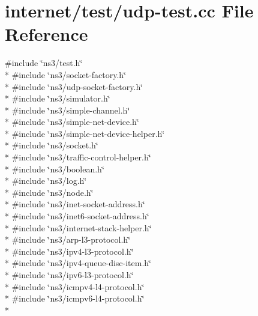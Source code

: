 \hypertarget{udp-test_8cc}{}\section{internet/test/udp-\/test.cc File Reference}
\label{udp-test_8cc}
{\ttfamily \#include \char`\"{}ns3/test.\+h\char`\"{}}\\*
{\ttfamily \#include \char`\"{}ns3/socket-\/factory.\+h\char`\"{}}\\*
{\ttfamily \#include \char`\"{}ns3/udp-\/socket-\/factory.\+h\char`\"{}}\\*
{\ttfamily \#include \char`\"{}ns3/simulator.\+h\char`\"{}}\\*
{\ttfamily \#include \char`\"{}ns3/simple-\/channel.\+h\char`\"{}}\\*
{\ttfamily \#include \char`\"{}ns3/simple-\/net-\/device.\+h\char`\"{}}\\*
{\ttfamily \#include \char`\"{}ns3/simple-\/net-\/device-\/helper.\+h\char`\"{}}\\*
{\ttfamily \#include \char`\"{}ns3/socket.\+h\char`\"{}}\\*
{\ttfamily \#include \char`\"{}ns3/traffic-\/control-\/helper.\+h\char`\"{}}\\*
{\ttfamily \#include \char`\"{}ns3/boolean.\+h\char`\"{}}\\*
{\ttfamily \#include \char`\"{}ns3/log.\+h\char`\"{}}\\*
{\ttfamily \#include \char`\"{}ns3/node.\+h\char`\"{}}\\*
{\ttfamily \#include \char`\"{}ns3/inet-\/socket-\/address.\+h\char`\"{}}\\*
{\ttfamily \#include \char`\"{}ns3/inet6-\/socket-\/address.\+h\char`\"{}}\\*
{\ttfamily \#include \char`\"{}ns3/internet-\/stack-\/helper.\+h\char`\"{}}\\*
{\ttfamily \#include \char`\"{}ns3/arp-\/l3-\/protocol.\+h\char`\"{}}\\*
{\ttfamily \#include \char`\"{}ns3/ipv4-\/l3-\/protocol.\+h\char`\"{}}\\*
{\ttfamily \#include \char`\"{}ns3/ipv4-\/queue-\/disc-\/item.\+h\char`\"{}}\\*
{\ttfamily \#include \char`\"{}ns3/ipv6-\/l3-\/protocol.\+h\char`\"{}}\\*
{\ttfamily \#include \char`\"{}ns3/icmpv4-\/l4-\/protocol.\+h\char`\"{}}\\*
{\ttfamily \#include \char`\"{}ns3/icmpv6-\/l4-\/protocol.\+h\char`\"{}}\\*
